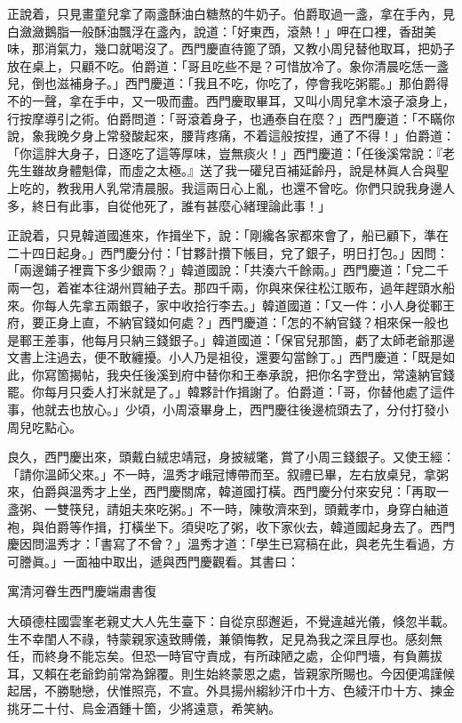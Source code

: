 正說着，只見畫童兒拿了兩盞酥油白糖熬的牛奶子。伯爵取過一盞，拿在手內，見白瀲瀲鵝脂一般酥油飄浮在盞內，說道：「好東西，滾熱！」呷在口裡，香甜美味，那消氣力，幾口就喝沒了。西門慶直待篦了頭，又教小周兒替他取耳，把奶子放在桌上，只顧不吃。伯爵道：「哥且吃些不是？可惜放冷了。象你清晨吃恁一盞兒，倒也滋補身子。」西門慶道：「我且不吃，你吃了，停會我吃粥罷。」那伯爵得不的一聲，拿在手中，又一吸而盡。{}西門慶取畢耳，又叫小周兒拿木滾子滾身上，行按摩導引之術。伯爵問道：「哥滾着身子，也通泰自在麼？」西門慶道：「不瞞你說，象我晚夕身上常發酸起來，腰背疼痛，不着這般按捏，通了不得！」伯爵道：「你這胖大身子，日逐吃了這等厚味，豈無痰火！」西門慶道：「任後溪常說：『老先生雖故身體魁偉，而虛之太極。』送了我一礶兒百補延齡丹，說是林眞人合與聖上吃的，教我用人乳常清晨服。我這兩日心上亂，也還不曾吃。你們只說我身邊人多，終日有此事，自從他死了，誰有甚麼心緒理論此事！」{}

正說着，只見韓道國進來，作揖坐下，說：「剛纔各家都來會了，船已顧下，準在二十四日起身。」西門慶分付：「甘夥計攢下帳目，兌了銀子，明日打包。」因問：「兩邊鋪子裡賣下多少銀兩？」韓道國說：「共湊六千餘兩。」西門慶道：「兌二千兩一包，着崔本往湖州買紬子去。那四千兩，你與來保往松江販布，過年趕頭水船來。你每人先拿五兩銀子，家中收拾行李去。」韓道國道：「又一件：小人身從鄆王府，要正身上直，不納官錢如何處？」西門慶道：「怎的不納官錢？相來保一般也是鄆王差事，他每月只納三錢銀子。」韓道國道：「保官兒那箇，虧了太師老爺那邊文書上注過去，便不敢纏擾。小人乃是祖役，還要勾當餘丁。」西門慶道：「既是如此，你寫箇揭帖，我央任後溪到府中替你和王奉承說，把你名字登出，常遠納官錢罷。你每月只委人打米就是了。」韓夥計作揖謝了。伯爵道：「哥，你替他處了這件事，他就去也放心。」少頃，小周滾畢身上，西門慶往後邊梳頭去了，分付打發小周兒吃點心。

良久，西門慶出來，頭戴白絨忠靖冠，身披絨氅，賞了小周三錢銀子。又使王經：「請你溫師父來。」不一時，溫秀才峨冠博帶而至。叙禮已畢，左右放桌兒，拿粥來，伯爵與溫秀才上坐，西門慶關席，韓道國打橫。西門慶分付來安兒：「再取一盞粥、一雙筷兒，請姐夫來吃粥。」不一時，陳敬濟來到，頭戴孝巾，身穿白紬道袍，與伯爵等作揖，打橫坐下。須臾吃了粥，收下家伙去，韓道國起身去了。西門慶因問溫秀才：「書寫了不曾？」溫秀才道：「學生已寫稿在此，與老先生看過，方可謄眞。」一面袖中取出，遞與西門慶觀看。其書曰：

\begin{myquote}[\markfont]
寓清河眷生西門慶端肅書復

大碩德柱國雲峯老親丈大人先生臺下：自從京邸邂逅，不覺違越光儀，倏忽半載。生不幸閨人不祿，特蒙親家遠致賻儀，兼領悔教，足見為我之深且厚也。感刻無任，而終身不能忘矣。但恐一時官守責成，有所疎陋之處，企仰門墻，有負薦拔耳，又賴在老爺鈞前常為錦覆。則生始終蒙恩之處，皆親家所賜也。今因便鴻謹候起居，不勝馳戀，伏惟照亮，不宣。外具揚州縐紗汗巾十方、色綾汗巾十方、揀金挑牙二十付、烏金酒鍾十箇，少將遠意，希笑納。
\end{myquote}

